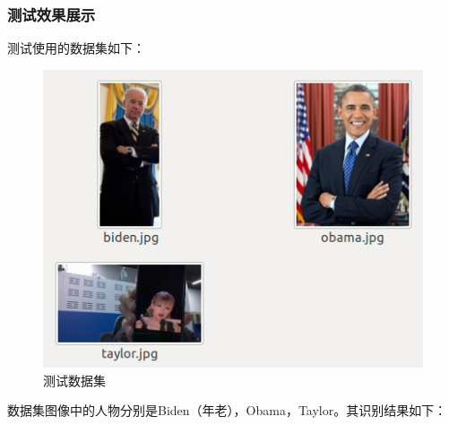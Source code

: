 \documentclass[UTF8]{article}
\begin{document}
\subsubsection{测试效果展示} 
测试使用的数据集如下：
\begin{figure}[H]
    \centering %
    \includegraphics[width=.6\textwidth]{figure/数据集.png} 
    \caption{测试数据集} %
\end{figure}
数据集图像中的人物分别是Biden（年老），Obama，Taylor。其识别结果如下：
\end{document}
